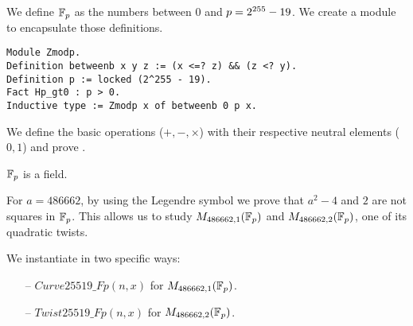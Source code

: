 We define $\mathbb{F}_{p}$ as the numbers between $0$ and $p = 2^{255}-19$.
We create a  module to encapsulate those definitions.
\begin{lstlisting}[language=Coq]
Module Zmodp.
Definition betweenb x y z := (x <=? z) && (z <? y).
Definition p := locked (2^255 - 19).
Fact Hp_gt0 : p > 0.
Inductive type := Zmodp x of betweenb 0 p x.
\end{lstlisting}

We define the basic operations ($+, -, \times$) with their respective neutral
elements ($0, 1$) and prove .
\begin{lemma}
  \label{lemma:Zmodp_field}
  $\mathbb{F}_{p}$ is a field.
\end{lemma}
For $a = 486662$, by using the Legendre symbol we prove that
$a^2 - 4$ and $2$ are not squares in $\mathbb{F}_{p}$.
This allows us to study $M_{486662,1}(\mathbb{F}_{p})$ and $M_{486662,2}(\mathbb{F}_{p})$, one of its quadratic twists.
\begin{dfn}
  We instantiate  in two specific ways:
  \begin{itemize}
    \item[--] $Curve25519\_Fp(n,x)$ for $M_{486662,1}(\mathbb{F}_{p})$.
    \item[--] $Twist25519\_Fp(n,x)$ for $M_{486662,2}(\mathbb{F}_{p})$.
  \end{itemize}
\end{dfn}

